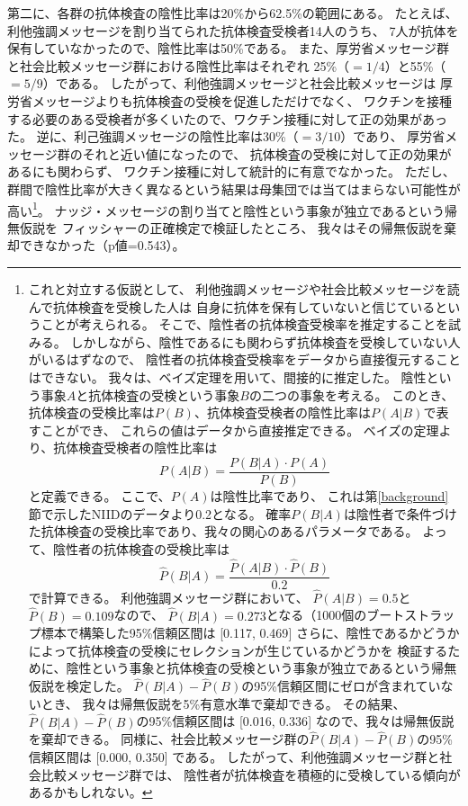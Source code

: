 \documentclass[
  11pt,
  a4paper,
]{article}
\begin{document}
第二に、各群の抗体検査の陰性比率は20\%から62.5\%の範囲にある。
たとえば、利他強調メッセージを割り当てられた抗体検査受検者14人のうち、
7人が抗体を保有していなかったので、陰性比率は50\%である。
また、厚労省メッセージ群と社会比較メッセージ群における陰性比率はそれぞれ
25\%（\(=1/4\)）と55\%（\(=5/9\)）である。
したがって、利他強調メッセージと社会比較メッセージは
厚労省メッセージよりも抗体検査の受検を促進しただけでなく、
ワクチンを接種する必要のある受検者が多くいたので、ワクチン接種に対して正の効果があった。
逆に、利己強調メッセージの陰性比率は30\%（\(=3/10\)）であり、
厚労省メッセージ群のそれと近い値になったので、
抗体検査の受検に対して正の効果があるにも関わらず、
ワクチン接種に対して統計的に有意でなかった。
ただし、群間で陰性比率が大きく異なるという結果は母集団では当てはまらない可能性が高い\footnote{これと対立する仮説として、
  利他強調メッセージや社会比較メッセージを読んで抗体検査を受検した人は
  自身に抗体を保有していないと信じているということが考えられる。
  そこで、陰性者の抗体検査受検率を推定することを試みる。
  しかしながら、陰性であるにも関わらず抗体検査を受検していない人がいるはずなので、
  陰性者の抗体検査受検率をデータから直接復元することはできない。
  我々は、ベイズ定理を用いて、間接的に推定した。
  陰性という事象\(A\)と抗体検査の受検という事象\(B\)の二つの事象を考える。
  このとき、抗体検査の受検比率は\(P(B)\)、抗体検査受検者の陰性比率は\(P(A|B)\)で表すことができ、
  これらの値はデータから直接推定できる。
  ベイズの定理より、抗体検査受検者の陰性比率は
  \[ P(A|B) = \frac{P(B|A) \cdot P(A)}{P(B)} \]
  と定義できる。
  ここで、\(P(A)\)は陰性比率であり、
  これは第\ref{background}節で示したNIIDのデータより0.2となる。
  確率\(P(B|A)\)は陰性者で条件づけた抗体検査の受検比率であり、我々の関心のあるパラメータである。
  よって、陰性者の抗体検査の受検比率は
  \[ \hat{P}(B|A) = \frac{\hat{P}(A|B) \cdot \hat{P}(B)}{0.2} \]
  で計算できる。
  利他強調メッセージ群において、
  \(\hat{P}(A|B) = 0.5\)と\(\hat{P}(B) = 0.109\)なので、
  \(\hat{P}(B|A) = 0.273\)となる（1000個のブートストラップ標本で構築した95\%信頼区間は
  {[}0.117, 0.469{]}
  さらに、陰性であるかどうかによって抗体検査の受検にセレクションが生じているかどうかを
  検証するために、陰性という事象と抗体検査の受検という事象が独立であるという帰無仮説を検定した。
  \(\hat{P}(B|A) - \hat{P}(B)\)の95\%信頼区間にゼロが含まれていないとき、
  我々は帰無仮説を5\%有意水準で棄却できる。
  その結果、\(\hat{P}(B|A) - \hat{P}(B)\)の95\%信頼区間は
  {[}0.016, 0.336{]}
  なので、我々は帰無仮説を棄却できる。
  同様に、社会比較メッセージ群の\(\hat{P}(B|A) - \hat{P}(B)\)の95\%信頼区間は
  {[}0.000, 0.350{]}
  である。
  したがって、利他強調メッセージ群と社会比較メッセージ群では、
  陰性者が抗体検査を積極的に受検している傾向があるかもしれない。}。
ナッジ・メッセージの割り当てと陰性という事象が独立であるという帰無仮説を
フィッシャーの正確検定で検証したところ、
我々はその帰無仮説を棄却できなかった（p値=0.543）。
\end{document}
